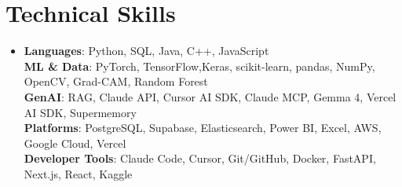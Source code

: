 \documentclass[letterpaper,10pt]{article}
\begin{document}
\section{Technical Skills}
 \begin{itemize}[leftmargin=0.15in, label={}]
    \item{
     \textbf{Languages}{: Python, SQL, Java, C++, JavaScript} \\
     \textbf{ML \& Data}{: PyTorch, TensorFlow,Keras, scikit-learn, pandas, NumPy, OpenCV, Grad-CAM, Random Forest} \\
     \textbf{GenAI}{: RAG, Claude API, Cursor AI SDK, Claude MCP, Gemma 4, Vercel AI SDK, Supermemory} \\
     \textbf{Platforms}{: PostgreSQL, Supabase, Elasticsearch, Power BI, Excel, AWS, Google Cloud, Vercel} \\
     \textbf{Developer Tools}{: Claude Code, Cursor, Git/GitHub, Docker, FastAPI, Next.js, React, Kaggle}
    }
 \end{itemize}
 \vspace{3.53pt}

\end{document}
